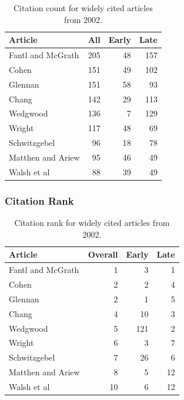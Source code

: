 \documentclass[
  10pt,
  letterpaper,
  DIV=11,
  numbers=noendperiod,
  twoside]{scrartcl}
\begin{document}
\begin{longtable}[]{@{}lrrr@{}}

\caption{\label{tbl-citation-count-2002}Citation count for widely cited
articles from 2002.}

\tabularnewline

\toprule\noalign{}
Article & All & Early & Late \\
\midrule\noalign{}
\endhead
\bottomrule\noalign{}
\endlastfoot
Fantl and McGrath & 205 & 48 & 157 \\
Cohen & 151 & 49 & 102 \\
Glennan & 151 & 58 & 93 \\
Chang & 142 & 29 & 113 \\
Wedgwood & 136 & 7 & 129 \\
Wright & 117 & 48 & 69 \\
Schwitzgebel & 96 & 18 & 78 \\
Matthen and Ariew & 95 & 46 & 49 \\
Walsh et al & 88 & 39 & 49 \\

\end{longtable}

\subsubsection*{Citation Rank}\label{citation-rank-26}

\begin{longtable}[]{@{}lrrr@{}}

\caption{\label{tbl-citation-rank-2002}Citation rank for widely cited
articles from 2002.}

\tabularnewline

\toprule\noalign{}
Article & Overall & Early & Late \\
\midrule\noalign{}
\endhead
\bottomrule\noalign{}
\endlastfoot
Fantl and McGrath & 1 & 3 & 1 \\
Cohen & 2 & 2 & 4 \\
Glennan & 2 & 1 & 5 \\
Chang & 4 & 10 & 3 \\
Wedgwood & 5 & 121 & 2 \\
Wright & 6 & 3 & 7 \\
Schwitzgebel & 7 & 26 & 6 \\
Matthen and Ariew & 8 & 5 & 12 \\
Walsh et al & 10 & 6 & 12 \\

\end{longtable}
\end{document}

